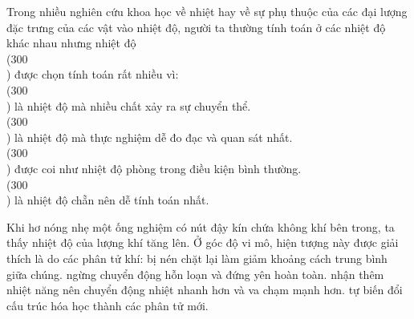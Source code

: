\begin{ex}
Trong nhiều nghiên cứu khoa học về nhiệt hay về sự phụ thuộc của các đại lượng đặc trưng của các vật vào nhiệt độ, người ta thường tính toán ở các nhiệt độ khác nhau nhưng nhiệt độ \\(300\ \\) được chọn tính toán rất nhiều vì:
\choice
{\\(300\ \\) là nhiệt độ mà nhiều chất xảy ra sự chuyển thể.}
{\\(300\ \\) là nhiệt độ mà thực nghiệm dễ đo đạc và quan sát nhất.}
{\True \\(300\ \\) được coi như nhiệt độ phòng trong điều kiện bình thường.}
{\\(300\ \\) là nhiệt độ chẵn nên dễ tính toán nhất.}
\end{ex}

\begin{ex}
Khi hơ nóng nhẹ một ống nghiệm có nút đậy kín chứa không khí bên trong, ta thấy nhiệt độ của lượng khí tăng lên. Ở góc độ vi mô, hiện tượng này được giải thích là do các phân tử khí:
\choice
{bị nén chặt lại làm giảm khoảng cách trung bình giữa chúng.}
{ngừng chuyển động hỗn loạn và đứng yên hoàn toàn.}
{\True nhận thêm nhiệt năng nên chuyển động nhiệt nhanh hơn và va chạm mạnh hơn.}
{tự biến đổi cấu trúc hóa học thành các phân tử mới.}
\end{ex}

